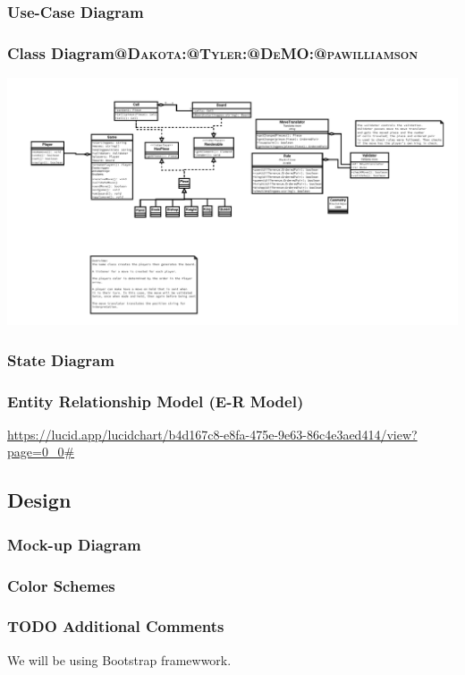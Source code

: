 \documentclass[11pt]{article}
\begin{document}
\subsubsection{Use-Case Diagram}
\label{sec:orgebb903e}

\subsubsection{Class Diagram\hfill{}\textsc{@Dakota:@Tyler:@DeMO:@pawilliamson}}
\label{sec:org4d3eb78}
\begin{center}
\includegraphics[width=.9\linewidth]{present/ClassDiagram.png}
\end{center}
\subsubsection{State Diagram}
\label{sec:org564f867}
\subsubsection{Entity Relationship Model (E-R Model)}
\label{sec:orgf466da3}
\url{https://lucid.app/lucidchart/b4d167c8-e8fa-475e-9e63-86c4e3aed414/view?page=0\_0\#}
\subsection{Design}
\label{sec:org0ad0c00}
\subsubsection{Mock-up Diagram}
\label{sec:orge0ce6b1}
\subsubsection{Color Schemes}
\label{sec:orgc10a44e}
\subsubsection{{\bfseries\sffamily TODO} Additional Comments}
\label{sec:org746b7be}
We will be using Bootstrap framewwork.
\end{document}
